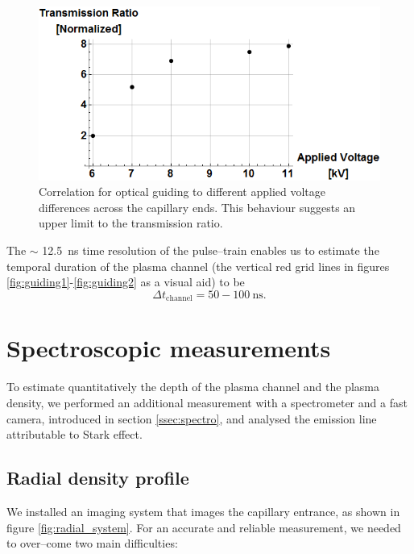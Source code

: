 \documentclass[../main.tex]{subfiles}
\begin{document}
\begin{figure}
    \centering
    \includegraphics[width=\textwidth]{figures/oscillator/voltage vs guiding.png}
    \caption{Correlation for optical guiding to different applied voltage differences across the capillary ends. This behaviour suggests an upper limit to the transmission ratio.}
    \label{fig:voltagevsguiding}
\end{figure}

The $\sim$ \SI{12.5}{\ns} time resolution of the pulse--train enables us to estimate the temporal duration of the plasma channel (the vertical red grid lines in figures \ref{fig:guiding1}-\ref{fig:guiding2} as a visual aid) to be $$\Delta t_\text{channel}=50 -100\ \si{\ns}.$$

\section{Spectroscopic measurements}\label{sec:spectro}
To estimate quantitatively the depth of the plasma channel and the plasma density, we performed an additional measurement with a spectrometer and a fast camera, introduced in section \ref{ssec:spectro}, and analysed the emission line attributable to Stark effect.

\subsection{Radial density profile}\label{ssec:radial}
We installed an imaging system that images the capillary entrance, as shown in figure \ref{fig:radial_system}. For an accurate and reliable measurement, we needed to over--come two main difficulties:
\end{document}
